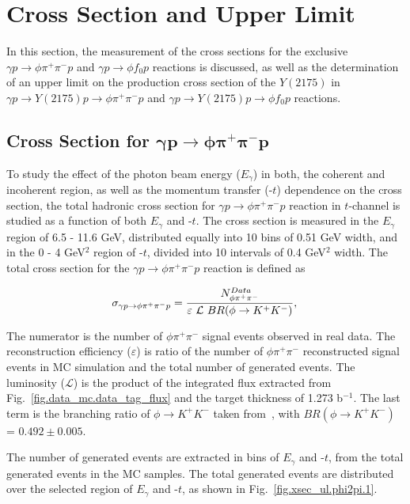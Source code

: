 \section{Cross Section and Upper Limit}
\label{sec.xsec_ul}

In this section, the measurement of the cross sections for the exclusive $\gamma p \rightarrow \phi \pi^+ \pi^- p$ and $\gamma p \rightarrow \phi f_0 p$ reactions is discussed, as well as the determination of an upper limit on the production cross section of the $Y(2175)$ in $\gamma p \rightarrow Y(2175) p \rightarrow \phi \pi^+ \pi^- p$ and $\gamma p \rightarrow Y(2175) p \rightarrow \phi f_0 p$ reactions.

\subsection{Cross Section for \texorpdfstring{$\bm{\gamma p \rightarrow \phi \pi^{+} \pi^{-} p}$}{} }
\label{sec.xsec_ul.phi2pi}

To study the effect of the photon beam energy ($E_{\gamma}$) in both, the coherent and incoherent region, as well as the momentum transfer (-$t$) dependence on the cross section, the total hadronic cross section for $\gamma p \rightarrow \phi \pi^{+} \pi^{-} p$ reaction in $t$-channel is studied as a function of both $E_{\gamma}$ and -$t$. The cross section is measured in the $E_{\gamma}$ region of 6.5 - 11.6 GeV, distributed equally into 10 bins of 0.51 GeV width, and in the 0 - 4 GeV$^2$ region of -$t$, divided into 10 intervals of 0.4 GeV$^2$ width. The total cross section for the $\gamma p \rightarrow \phi \pi^{+} \pi^{-} p$ reaction is defined as

\begin{equation}
    \label{eq.xsec_ul.phi2pi}
    \sigma_{\gamma p \rightarrow \phi \pi^{+} \pi^{-} p} = \frac{N_{\phi\pi^+\pi^-}^{Data}}{\varepsilon~\mathcal{L}~BR(\phi\rightarrow K^{+}K^{-})},\\
\end{equation}

\noindent The numerator is the number of $\phi\pi^+\pi^-$ signal events observed in real data. The reconstruction efficiency ($\varepsilon$) is ratio of the number of $\phi\pi^+\pi^-$ reconstructed signal events in MC simulation and the total number of generated events. The luminosity ($\mathcal{L}$) is the product of the integrated flux extracted from Fig.~\ref{fig.data_mc.data_tag_flux} and the target thickness of 1.273 b$^{-1}$. The last term is the branching ratio of $\phi\rightarrow K^{+}K^{-}$ taken from~\cite{Tanabashi18}, with $BR(\phi\rightarrow K^{+}K^{-})$ = $0.492 \pm 0.005$.
\par The number of generated events are extracted in bins of $E_{\gamma}$ and -$t$, from the total generated events in the MC samples. The total generated events are distributed over the selected region of $E_{\gamma}$ and -$t$, as shown in Fig.~\ref{fig.xsec_ul.phi2pi.1}.

